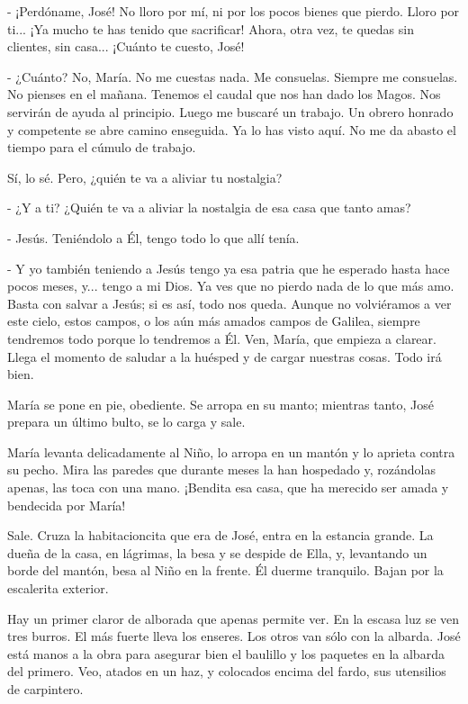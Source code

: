 \documentclass[12pt]{book} %
\begin{document}
- ¡Perdóname, José! No lloro por mí, ni por los pocos bienes que pierdo. Lloro por ti... ¡Ya mucho te has tenido que sacrificar! Ahora, otra vez, te quedas sin clientes, sin casa... ¡Cuánto te cuesto, José! 

- ¿Cuánto? No, María. No me cuestas nada. Me consuelas. Siempre me consuelas. No pienses en el mañana. Tenemos el caudal que nos han dado los Magos. Nos servirán de ayuda al principio. Luego me buscaré un trabajo. Un obrero honrado y competente se abre camino enseguida. Ya lo has visto aquí. No me da abasto el tiempo para el cúmulo de trabajo. 

Sí, lo sé. Pero, ¿quién te va a aliviar tu nostalgia? 

- ¿Y a ti? ¿Quién te va a aliviar la nostalgia de esa casa que tanto amas? 

- Jesús. Teniéndolo a Él, tengo todo lo que allí tenía. 

- Y yo también teniendo a Jesús tengo ya esa patria que he esperado hasta hace pocos meses, y... tengo a mi Dios. Ya ves que no pierdo nada de lo que más amo. Basta con salvar a Jesús; si es así, todo nos queda. Aunque no volviéramos a ver este cielo, estos campos, o los aún más amados campos de Galilea, siempre tendremos todo porque lo tendremos a Él. Ven, María, que empieza a clarear. Llega el momento de saludar a la huésped y de cargar nuestras cosas. Todo irá bien. 

María se pone en pie, obediente. Se arropa en su manto; mientras tanto, José prepara un último bulto, se lo carga y sale. 

María levanta delicadamente al Niño, lo arropa en un mantón y lo aprieta contra su pecho. Mira las paredes que durante meses la han hospedado y, rozándolas apenas, las toca con una mano. ¡Bendita esa casa, que ha merecido ser amada y bendecida por María! 

Sale. Cruza la habitacioncita que era de José, entra en la estancia grande. La dueña de la casa, en lágrimas, la besa y se despide de Ella, y, levantando un borde del mantón, besa al Niño en la frente. Él duerme tranquilo. Bajan por la escalerita exterior. 

Hay un primer claror de alborada que apenas permite ver. En la escasa luz se ven tres burros. El más fuerte lleva los enseres. Los otros van sólo con la albarda. José está manos a la obra para asegurar bien el baulillo y los paquetes en la albarda del primero. Veo, atados en un haz, y colocados encima del fardo, sus utensilios de carpintero. 
\end{document}
